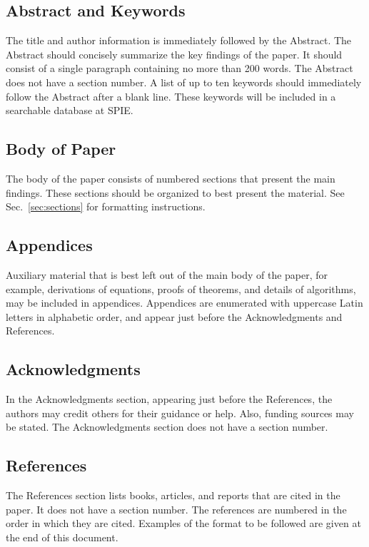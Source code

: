 \documentclass[]{spie}  %
\begin{document}
\subsection{Abstract and Keywords}
The title and author information is immediately followed by the
Abstract. The Abstract should concisely summarize the key findings of
the paper.  It should consist of a single paragraph containing no more
than 200 words.  The Abstract does not have a section number.  A list
of up to ten keywords should immediately follow the Abstract after a
blank line.  These keywords will be included in a searchable database
at SPIE.

\subsection{Body of Paper}
The body of the paper consists of numbered sections that present the
main findings.  These sections should be organized to best present the
material.  See Sec.~\ref{sec:sections} for formatting instructions.

\subsection{Appendices}
Auxiliary material that is best left out of the main body of the
paper, for example, derivations of equations, proofs of theorems, and
details of algorithms, may be included in appendices.  Appendices are
enumerated with uppercase Latin letters in alphabetic order, and
appear just before the Acknowledgments and References.

\subsection{Acknowledgments}
In the Acknowledgments section, appearing just before the References,
the authors may credit others for their guidance or help.  Also,
funding sources may be stated.  The Acknowledgments section does not
have a section number.

\subsection{References}
The References section lists books, articles, and reports that are
cited in the paper.  It does not have a section number.  The
references are numbered in the order in which they are cited.
Examples of the format to be followed are given at the end of this
document.
\end{document}

